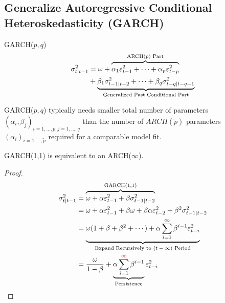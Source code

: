 \documentclass[11pt]{article}
\begin{document}
        \subsection{Generalize Autoregressive Conditional Heteroskedasticity (GARCH)}
            \begin{definition}
                GARCH($p,q$)
                \begin{align}
                     \sigma_{t|t-1}^2 &= \omega + \overbrace{
                        \alpha_1 \varepsilon_{t-1}^2 + \cdots + \alpha_p \varepsilon_{t-p}^2
                     }^{\text{{ARCH($p$) Part}}} \\
                     &+ \underbrace{\beta_1 \sigma_{t-1|t-2}^2 + \cdots + \beta_q \sigma_{t-q|t-q-1}^2}_{\text{{Generalized Past Conditional Part}}}
                \end{align}
            \end{definition}
            
            \begin{remark}
                GARCH($p,q$) typically needs smaller total number of parameters $(\alpha_i, \beta_j)_{i=1,\dots,p; j=1,\dots,q}$ than the number of $ARCH(\tilde{p})$ parameters $(\alpha_i)_{i=1,\dots,\tilde{p}}$ required for a comparable model fit.
            \end{remark}
            
            \begin{proposition}
                GARCH(1,1) is equivalent to an ARCH($\infty$).
                \begin{proof}
                    \begin{align}
                        \sigma_{t|t-1}^2 &= \overbrace{\omega + \alpha \varepsilon_{t-1}^2 + \beta \sigma_{t-1|t-2}^2}^{\text{{GARCH(1,1)}}} \\
                        &= \omega + \alpha \varepsilon_{t-1}^2 + \beta \omega + \beta \alpha \varepsilon_{t-2}^2 + \beta^2 \sigma_{t-1|t-2}^2 \\
                        &= \underbrace{\omega(1 + \beta + \beta^2 + \cdots) + \alpha \sum_{i=1}^\infty \beta^{i-1} \varepsilon_{t-i}^2}_{\text{{Expand Recursively to $(t-\infty)$ Period}}} \\
                        &= \frac{\omega}{1 - \beta} + \underbrace{\alpha \sum_{i=1}^{\textcolor{red}{\infty}} \beta^{i-1}}_{\text{{Persistence}}} \varepsilon_{t-i}^2
                    \end{align}
                \end{proof}
            \end{proposition}
            
\end{document}
